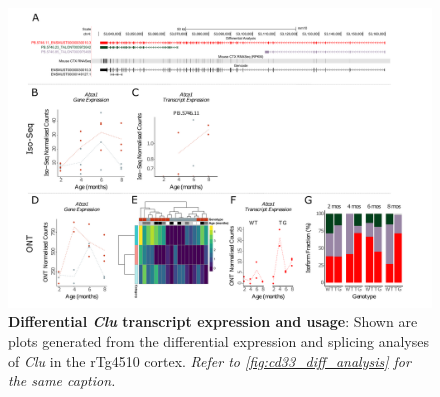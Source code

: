 \begin{landscape}
	\begin{figure}[htp]
		\begin{center}
			\includegraphics[page=8,trim={0 0.5cm 0 1.5cm},scale =0.85]{Figures/TargetGene_DifferentialAnalysis.pdf}
		\end{center}
		\captionsetup{width=1.5\textwidth}
		\caption[Differential \textit{Clu} transcript expression and usage]%
		{\textbf{Differential \textit{Clu} transcript expression and usage}: Shown are plots generated from the differential expression and splicing analyses of \textit{Clu} in the rTg4510 cortex. \textit{Refer to \cref{fig:cd33_diff_analysis} for the same caption.}}   
		\label{fig:Clu_diff_analysis}
	\end{figure}
\end{landscape}

